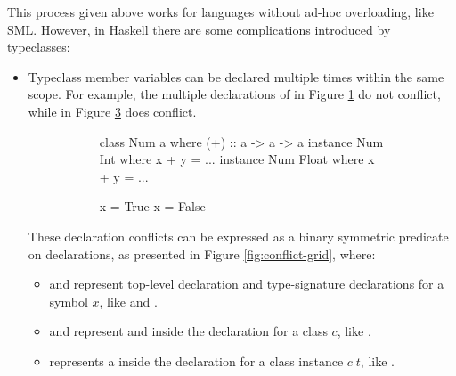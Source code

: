 \documentclass[dissertation.tex]{subfiles}
\begin{document}
{{        This process given above works for languages without ad-hoc overloading, like SML. However, in Haskell there are some complications introduced by typeclasses:

        \begin{itemize}
        \item
        {
            Typeclass member variables can be declared multiple times within the same scope. For example, the multiple declarations of \haskell{(+)} in Figure \ref{fig:typeclass-scope} do not conflict, while  in Figure \ref{fig:top-scope} does conflict.

            \begin{figure}[H]
            \centering
            \begin{subfigure}[t]{0.4\textwidth}
            \begin{haskellfigure}
            class Num a where
                (+) :: a -> a -> a
            instance Num Int where
                x + y = ...
            instance Num Float where
                x + y = ...
            \end{haskellfigure}
            \caption{}
            \label{fig:typeclass-scope}
            \end{subfigure}
            \hspace{5mm}
            \begin{subfigure}[t]{0.4\textwidth}
            \begin{haskellfigure}
            x = True
            x = False
            \end{haskellfigure}
            \caption{}
            \label{fig:top-scope}
            \end{subfigure}
            \caption{}
            \end{figure}

            These declaration conflicts can be expressed as a binary symmetric predicate on declarations, as presented in Figure \ref{fig:conflict-grid}, where:

            \begin{itemize}
            \item
            {
                 and  represent top-level declaration and type-signature declarations for a symbol \(x\), like  and .
            }
            \item
            {
                 and  represent  and  inside the declaration for a class \(c\), like .
            }
            \item
            {
                 represents a  inside the declaration for a class instance \(c\;t\), like .
            }
            \end{itemize}

}
\end{itemize}}}
\end{document}

